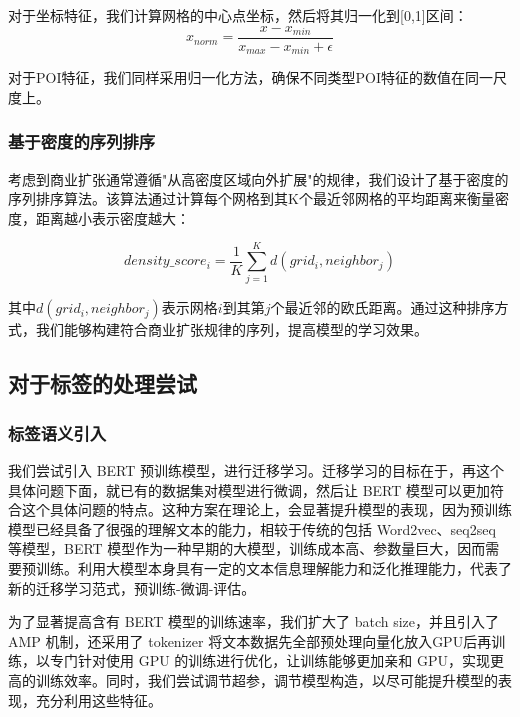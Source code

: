 \documentclass{article}
\begin{document}
对于坐标特征，我们计算网格的中心点坐标，然后将其归一化到[0,1]区间：
\begin{equation}
x_{norm} = \frac{x - x_{min}}{x_{max} - x_{min} + \epsilon}
\end{equation}

对于POI特征，我们同样采用归一化方法，确保不同类型POI特征的数值在同一尺度上。

\subsubsection{基于密度的序列排序}

考虑到商业扩张通常遵循"从高密度区域向外扩展"的规律，我们设计了基于密度的序列排序算法。该算法通过计算每个网格到其K个最近邻网格的平均距离来衡量密度，距离越小表示密度越大：

\begin{equation}
density\_score_i = \frac{1}{K}\sum_{j=1}^{K} d(grid_i, neighbor_j)
\end{equation}

其中$d(grid_i, neighbor_j)$表示网格$i$到其第$j$个最近邻的欧氏距离。通过这种排序方式，我们能够构建符合商业扩张规律的序列，提高模型的学习效果。

\subsection{对于标签的处理尝试}

\subsubsection{标签语义引入}

我们尝试引入 BERT 预训练模型，进行迁移学习。迁移学习的目标在于，再这个具体问题下面，就已有的数据集对模型进行微调，然后让 BERT 模型可以更加符合这个具体问题的特点。这种方案在理论上，会显著提升模型的表现，因为预训练模型已经具备了很强的理解文本的能力，相较于传统的包括 Word2vec、seq2seq 等模型，BERT 模型作为一种早期的大模型，训练成本高、参数量巨大，因而需要预训练。利用大模型本身具有一定的文本信息理解能力和泛化推理能力，代表了新的迁移学习范式，预训练-微调-评估\cite{devlin-etal-2019-bert}。

为了显著提高含有 BERT 模型的训练速率，我们扩大了 batch size，并且引入了 AMP 机制\cite{micikevicius_mixed_2018}，还采用了 tokenizer 将文本数据先全部预处理向量化放入GPU后再训练，以专门针对使用 GPU 的训练进行优化，让训练能够更加亲和 GPU，实现更高的训练效率。同时，我们尝试调节超参，调节模型构造，以尽可能提升模型的表现，充分利用这些特征。
\end{document}
